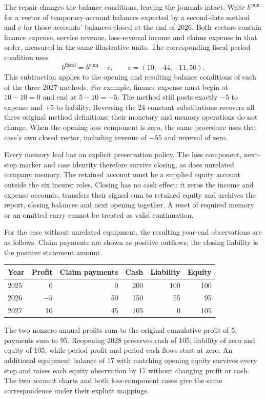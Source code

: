 The repair changes the balance conditions, leaving the journals intact. Write
$b^{\mathrm{cum}}$ for a vector of temporary-account balances expected by a
second-date method and $c$ for those accounts' balances closed at the end of
2026. Both vectors contain finance expense, service revenue, loss-reversal
income and claims expense in that order, measured in the same illustrative
units. The corresponding fiscal-period condition uses
\[
 b^{\mathrm{fiscal}}=b^{\mathrm{cum}}-c,
 \qquad c=(10,-44,-11,50).
\]
This subtraction applies to the opening and resulting balance conditions of
each of the three 2027 methods. For example, finance expense must begin at
$10-10=0$ and end at $5-10=-5$. The method still posts exactly $-5$ to expense
and $+5$ to liability. Reversing the 24 constant substitutions recovers all
three original method definitions; their monetary and memory operations do
not change. When the opening loss component is zero, the same procedure uses
that case's own closed vector, including revenue of $-55$ and reversal of zero.

Every memory leaf has an explicit preservation policy. The loss component,
next-step marker and case identity therefore survive closing, as does unrelated
company memory. The retained account must be a supplied equity account outside
the six insurer roles. Closing has no cash effect: it zeros the income and
expense accounts, transfers their signed sum to retained equity and archives
the report, closing balances and next opening together. A reset of required
memory or an omitted carry cannot be treated as valid continuation.

For the case without unrelated equipment, the resulting year-end observations
are as follows. Claim payments are shown as positive outflows; the closing
liability is the positive statement amount.
\begin{center}\small
\begin{tabular}{lrrrrr}
\toprule
Year & Profit & Claim payments & Cash & Liability & Equity \\
\midrule
2025 & 0 & 0 & 200 & 100 & 100 \\
2026 & $-5$ & 50 & 150 & 55 & 95 \\
2027 & 10 & 45 & 105 & 0 & 105 \\
\bottomrule
\end{tabular}
\end{center}
The two nonzero annual profits sum to the original cumulative profit of 5;
payments sum to 95. Reopening 2028 preserves cash of 105, liability of zero
and equity of 105, while period profit and period cash flows start at zero.
An additional equipment balance of 17 with matching opening equity survives
every step and raises each equity observation by 17 without changing profit
or cash. The two account charts and both loss-component cases give the same
correspondence under their explicit mappings.

